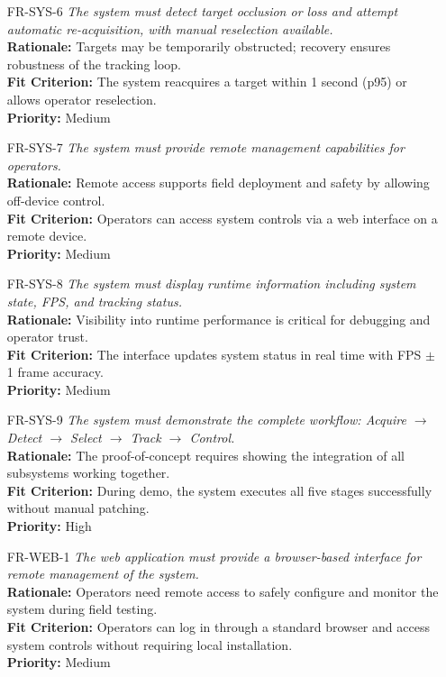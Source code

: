 \documentclass[12pt]{article}
\begin{document}
\begin{itemize}
  \item[FR-SYS-6] \emph{The system must detect target occlusion or loss and attempt
          automatic re-acquisition, with manual reselection available.}\\[2mm]
        {\bf Rationale:} Targets may be temporarily obstructed; recovery ensures robustness of the tracking loop.\\
        {\bf Fit Criterion:} The system reacquires a target within 1 second (p95) or allows operator reselection.\\
        {\bf Priority:} Medium

  \item[FR-SYS-7] \emph{The system must provide remote management capabilities for
          operators.}\\[2mm]
        {\bf Rationale:} Remote access supports field deployment and safety by allowing off-device control.\\
        {\bf Fit Criterion:} Operators can access system controls via a web interface on a remote device.\\
        {\bf Priority:} Medium

  \item[FR-SYS-8] \emph{The system must display runtime information including system
          state, FPS, and tracking status.}\\[2mm]
        {\bf Rationale:} Visibility into runtime performance is critical for debugging and operator trust.\\
        {\bf Fit Criterion:} The interface updates system status in real time with FPS $\pm$ 1 frame accuracy.\\
        {\bf Priority:} Medium

  \item[FR-SYS-9] \emph{The system must demonstrate the complete workflow: Acquire
          $\rightarrow$ Detect $\rightarrow$ Select $\rightarrow$ Track $\rightarrow$
          Control.}\\[2mm]
        {\bf Rationale:} The proof-of-concept requires showing the integration of all subsystems working together.\\
        {\bf Fit Criterion:} During demo, the system executes all five stages successfully without manual patching.\\
        {\bf Priority:} High

  \item[FR-WEB-1] \emph{The web application must provide a browser-based interface for
          remote management of the system.}\\[2mm]
        {\bf Rationale:} Operators need remote access to safely configure and monitor the system during field testing.\\
        {\bf Fit Criterion:} Operators can log in through a standard browser and access system controls without requiring local installation.\\
        {\bf Priority:} Medium


\end{itemize}
\end{document}
